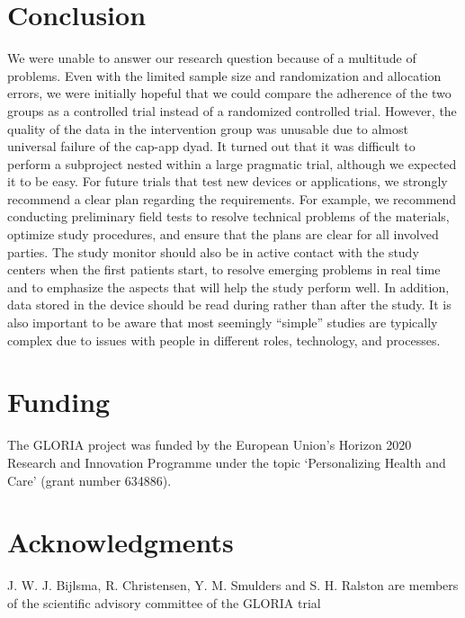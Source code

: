 \documentclass[twocolumn, issue, empirical, authordate]{jote-new-article}
\begin{document}
\section{Conclusion}

 We were unable to answer our research question because of a multitude of problems. Even with the limited sample size and randomization and allocation errors, we were initially hopeful that we could compare the adherence of the two groups as a controlled trial instead of a randomized controlled trial. However, the quality of the data in the intervention group was unusable due to almost universal failure of the cap-app dyad. It turned out that it was difficult to perform a subproject nested within a large pragmatic trial, although we expected it to be easy.
 For future trials that test new devices or applications, we strongly recommend a clear plan regarding the requirements. For example, we recommend conducting preliminary field tests to resolve technical problems of the materials, optimize study procedures, and ensure that the plans are clear for all involved parties. The study monitor should also be in active contact with the study centers when the first patients start, to resolve emerging problems in real time and to emphasize the aspects that will help the study perform well. In addition, data stored in the device should be read during rather than after the study. It is also important to be aware that most seemingly ``simple'' studies are typically complex due to issues with people in different roles, technology, and processes.





\printbibliography


\section{Funding}
The GLORIA project was funded by the European Union’s Horizon 2020 Research and Innovation Programme under the topic ‘Personalizing Health and Care’ (grant number 634886).
\section{Acknowledgments}
J. W. J. Bijlsma, R. Christensen, Y. M. Smulders and S. H. Ralston are members of the scientific advisory committee of the GLORIA trial
\end{document}
